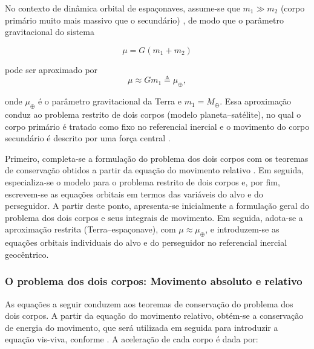 No contexto de dinâmica orbital de espaçonaves, assume-se que $m_1 \gg m_2$ (corpo primário muito mais massivo que o secundário) \cite{wie2008space}, de modo que o parâmetro gravitacional do sistema

\begin{equation}
\mu = G(m_1+m_2)
\end{equation}

pode ser aproximado por
\begin{equation}
\mu \approx Gm_1 \triangleq \mu_\oplus,
\end{equation}

onde $\mu_\oplus$ é o parâmetro gravitacional da Terra e $m_1=M_\oplus$.
Essa aproximação conduz ao problema restrito de dois corpos (modelo planeta--satélite), no qual o corpo primário é tratado como fixo no referencial inercial e o movimento do corpo secundário é descrito por uma força central \cite{wie2008space}.

Primeiro, completa-se a formulação do problema dos dois corpos com os teoremas de conservação obtidos a partir da equação do movimento relativo \cite{wie2008space}. Em seguida, especializa-se o modelo para o problema restrito de dois corpos e, por fim, escrevem-se as equações orbitais em termos das variáveis do alvo e do perseguidor.
A partir deste ponto, apresenta-se inicialmente a formulação geral do problema dos dois corpos e seus integrais de movimento. Em seguida, adota-se a aproximação restrita (Terra--espaçonave), com $\mu\approx\mu_\oplus$, e introduzem-se as equações orbitais individuais do alvo e do perseguidor no referencial inercial geocêntrico.


\subsubsection{O problema dos dois corpos: Movimento absoluto e relativo}

As equações a seguir conduzem aos teoremas de conservação do problema dos dois corpos.
A partir da equação do movimento relativo, obtém-se a conservação de energia do movimento, que será utilizada em seguida para introduzir a equação vis-viva, conforme \cite{wie2008space}.
A aceleração de cada corpo é dada por:

